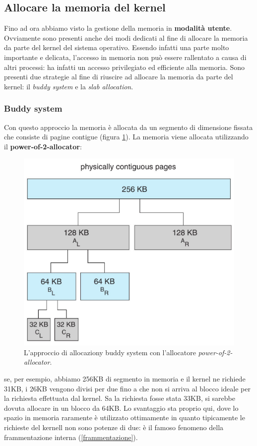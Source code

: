 % 
\subsection{Allocare la memoria del kernel}
Fino ad ora abbiamo visto la gestione della memoria in \textbf{modalità utente}. Ovviamente sono presenti anche dei modi dedicati al fine di allocare la memoria da parte del kernel del sistema operativo. Essendo infatti una parte molto importante e delicata, l'accesso in memoria non può essere rallentato a causa di altri processi: ha infatti un accesso privilegiato ed efficiente alla memoria. Sono presenti due strategie al fine di riuscire ad allocare la memoria da parte del kernel: il \textit{buddy system} e la \textit{slab allocation}.

% 
\subsubsection{Buddy system}
Con questo approccio la memoria è allocata da un segmento di dimensione fissata che consiste di pagine contigue (figura \ref{fig:buddy_system}). La memoria viene allocata utilizzando il \textbf{power-of-2-allocator}:
\begin{figure}[h]
    \centering
    \includegraphics[width = .4\textwidth]{../res/imgs/virtual memory/buddy_system.png}
    \caption{L'approccio di allocaziony buddy system con l'allocatore \textit{power-of-2-allocator}.}
    \label{fig:buddy_system}
\end{figure}
se, per esempio, abbiamo 256KB di segmento in memoria e il kernel ne richiede 31KB, i 26KB vengono divisi per due fino a che non si arriva al blocco ideale per la richiesta effettuata dal kernel. Sa la richiesta fosse stata 33KB, si sarebbe dovuta allocare in un blocco da 64KB. Lo svantaggio sta proprio qui, dove lo spazio in memoria raramente è utilizzato ottimamente in quanto tipicamente le richieste del kernell non sono potenze di due: è il famoso fenomeno della frammentazione interna (\ref{frammentazione}).

% 
